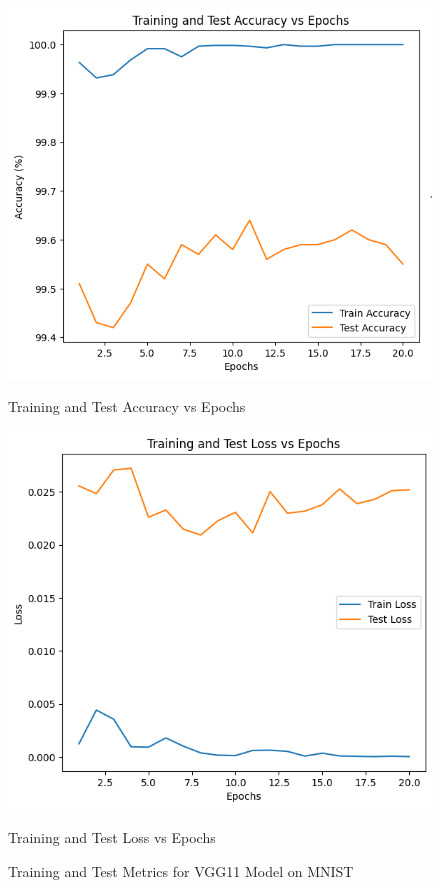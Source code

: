 \documentclass[10pt,letter,notitlepage]{article}
\begin{document}
\begin{center}
\begin{figure}[H]
    \centering
    \begin{minipage}{0.45\textwidth}
        \centering
        \includegraphics[width=\textwidth]{training_test_accuracy.png}
        \caption{Training and Test Accuracy vs Epochs}
        \label{fig:accuracy}
    \end{minipage}
    \hfill
    \begin{minipage}{0.45\textwidth}
        \centering
        \includegraphics[width=\textwidth]{training_test_loss.png}
        \caption{Training and Test Loss vs Epochs}
        \label{fig:loss}
    \end{minipage}
    \caption{Training and Test Metrics for VGG11 Model on MNIST}
    \label{fig:results}
\end{figure}


\end{center}
\end{document}
